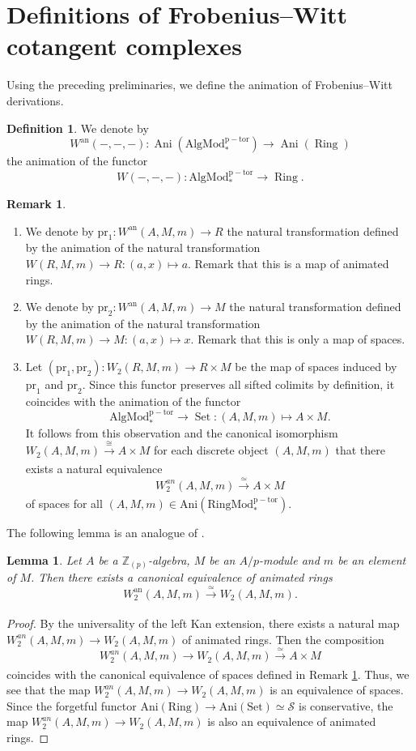 \documentclass[11pt, a4paper]{amsart}
\theoremstyle{plain}
\newtheorem{lemma}[theorem]{Lemma}
\theoremstyle{definition}
\newtheorem{definition}[theorem]{Definition}
\newtheorem{remark}[theorem]{Remark}
\begin{document}
\section{Definitions of Frobenius--Witt cotangent complexes}
Using the preceding preliminaries, we define the animation of Frobenius--Witt derivations.
\begin{definition}\label{def4.1}
    We denote by \[W^{\mathrm{an}}(-,-,-):\operatorname{Ani}(\operatorname{AlgMod^{p-tor}_*})\to \operatorname{Ani}(\operatorname{Ring})\] the animation of the functor
    \[W(-,-,-):\operatorname{AlgMod^{p-tor}_*}\to \operatorname{Ring}.\] 
\end{definition}
\begin{remark}\label{rem4.2}
    \begin{enumerate}
        \item We denote by $\mathrm{pr}_1:W^{\mathrm{an}}(A,M,m)\to R$ the natural transformation defined by the animation of the natural transformation $W(R,M,m)\to R:(a,x)\mapsto a$. Remark that this is a map of animated rings.
        \item We denote by $\mathrm{pr}_2:W^{\mathrm{an}}(A,M,m)\to M$ the natural transformation defined by the animation of the natural transformation $W(R,M,m)\to M:(a,x)\mapsto x$. Remark that this is only a map of spaces.
        \item Let $(\mathrm{pr}_1,\mathrm{pr}_2):W_2(R,M,m)\to R\times M$ be the map of spaces induced by $\mathrm{pr}_1$ and $\mathrm{pr}_2$. Since this functor preserves all sifted colimits by definition, it coincides with the animation of the functor \[\operatorname{AlgMod_*^{p-tor}}\to \operatorname{Set}:(A,M,m)\mapsto A\times M.\]  It follows from this observation and the canonical isomorphism $W_2(A,M,m)\xrightarrow[]{\cong}A\times M$ for each discrete object $(A,M,m)$ that there exists a natural equivalence \[W_2^{an}(A,M,m)\xrightarrow[]{\simeq } A\times M\] of spaces for all $(A,M,m)\in \operatorname{Ani(RingMod_*^{p-tor})}$.
    \end{enumerate}
\end{remark}
The following lemma is an analogue of \cite[Proposition A.3]{BL22}.
\begin{lemma}\label{lem4.3}
    Let $A$ be a $\mathbb Z_{(p)}$-algebra, $M$ be an $A/p$-module and $m$ be an element of $M$. Then there exists a canonical equivalence of animated rings\[W^{\mathrm{an}}_2(A,M,m)\xrightarrow[]{\simeq } W_2(A,M,m).\]
\end{lemma}
\begin{proof}
    By the universality of the left Kan extension, there exists a natural map $W_2^{an}(A,M,m)\to W_2(A,M,m)$ of animated rings. Then the composition \[W_2^{an}(A,M,m)\to W_2(A,M,m)\xrightarrow[]{\simeq}A\times M\] coincides with the canonical equivalence of spaces defined in Remark \ref{rem4.2}. Thus, we see that the map $W_2^{an}(A,M,m)\to W_2(A,M,m)$ is an equivalence of spaces. Since the forgetful functor $\operatorname{Ani(Ring)}\to \operatorname{Ani(Set)}\simeq \mathcal S$ is conservative, the map $W_2^{an}(A,M,m)\to W_2(A,M,m)$ is also an equivalence of animated rings.
\end{proof}
\end{document}

